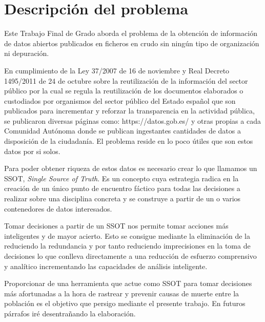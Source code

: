 \chapter{Descripción del problema}

Este Trabajo Final de Grado aborda el problema de la obtención de información de datos 
abiertos publicados en ficheros en crudo sin ningún tipo de organización ni depuración.

En cumplimiento de la Ley 37/2007 de 16 de noviembre y Real Decreto 1495/2011 de 24 de 
octubre sobre la reutilización de la información del sector público por la cual se regula 
la reutilización de los documentos elaborados o custodiados por organismos del sector 
público del Estado español que son publicados para incrementar y reforzar la 
transparencia en la actividad pública, se publicaron diversas páginas como: https://datos.gob.es/ 
y otras propias a cada Comunidad Autónoma donde se publican ingestantes cantidades de 
datos a disposición de la ciudadanía. El problema reside en lo poco útiles que son
estos datos por si solos. 

Para poder obtener riqueza de estos datos es necesario crear lo que 
llamamos un SSOT, \textit{Single Source of Truth}. Es un concepto cuya estrategia radica 
en la creación de un único punto de encuentro fáctico para todas las decisiones a 
realizar sobre una disciplina concreta y se construye a partir de un o varios contenedores 
de datos interesados.

Tomar decisiones a partir de un SSOT nos permite tomar acciones más inteligentes 
y de mayor acierto. Esto se consigue mediante la eliminación de la reduciendo la 
redundancia y por tanto reduciendo imprecisiones en la toma de decisiones lo que 
conlleva directamente a una reducción de esfuerzo comprensivo y analítico incrementando 
las capacidades de análisis inteligente. 

Proporcionar de una herramienta que actue como SSOT para tomar decisiones
más afortunadas a la hora de rastrear y prevenir causas de muerte entre la 
población es el objetivo que persigo mediante el presente trabajo. En futuros párrafos iré
desentrañando la elaboración.